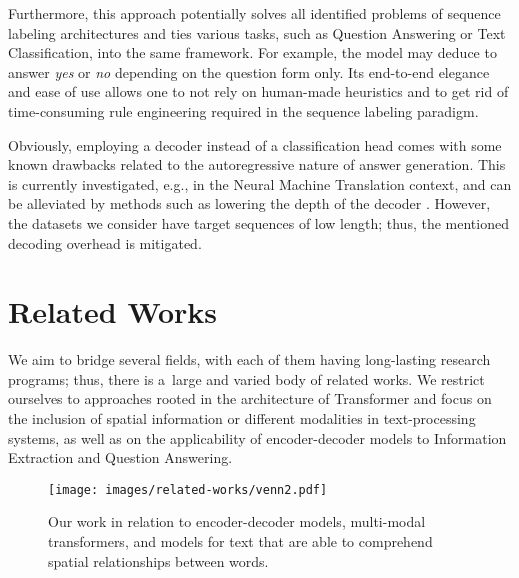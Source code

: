 \documentclass[runningheads]{llncs}
\begin{document}
Furthermore, this approach potentially solves all identified problems of sequence labeling architectures and ties various tasks, such as Question Answering or Text Classification, into the same framework. For example, the model may deduce to answer \textit{yes} or \textit{no} depending on the question form only. Its end-to-end elegance and ease of use allows one to not rely on human-made heuristics and to get rid of time-consuming rule engineering required in the sequence labeling paradigm. 

Obviously, employing a decoder instead of a classification head comes with some known drawbacks related to the autoregressive nature of answer generation. This is currently investigated, e.g., in the Neural Machine Translation context, and can be alleviated by methods such as lowering the depth of the decoder \cite{ren-etal-2020-study,kasai2020deep}. However, the datasets we consider have target sequences of low length; thus, the mentioned decoding overhead is mitigated.

































\section{Related Works}\label{sec:related_works}

We aim to bridge several fields, with each of them having long-lasting research programs; thus, there is a~large and varied body of related works. We restrict ourselves to approaches rooted in the architecture of Transformer \cite{transformer} and focus on the inclusion of spatial information or different modalities in text-processing systems, as well as on the applicability of encoder-decoder models to Information Extraction and Question Answering.



\begin{figure}[t]
    \centering
    \texttt{[image: images/related-works/venn2.pdf]}
    \caption{Our work in relation to encoder-decoder models, multi-modal transformers, and models for text that are able to comprehend spatial relationships between words.}
    \label{fig:venn}
\end{figure}
\end{document}
